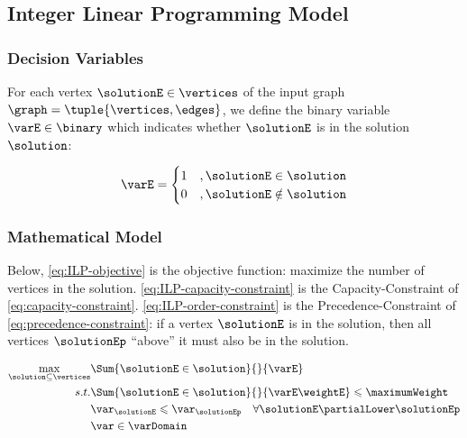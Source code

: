 \subsection{Integer Linear Programming Model}

\subsubsection{Decision Variables}

For each vertex $\solutionE \in \vertices$ of the input graph $\graph = \tuple{\vertices, \edges}$, we define the binary variable $\varE \in \binary$ which indicates whether $\solutionE$ is in the solution $\solution$:

\begin{equation}
    \label{eq:decision-variables}
    \varE =  \begin{cases}
      1 &, \solutionE \in \solution \\
      0 &, \solutionE \notin \solution
   \end{cases}
\end{equation}

\subsubsection{Mathematical Model}

Below, \eqref{eq:ILP-objective} is the objective function: maximize the number of vertices in the solution.
\eqref{eq:ILP-capacity-constraint} is the Capacity-Constraint of \eqref{eq:capacity-constraint}.
\eqref{eq:ILP-order-constraint} is the Precedence-Constraint of \eqref{eq:precedence-constraint}: if a vertex $\solutionE$ is in the solution, then all vertices $\solutionEp$ ``above'' it must also be in the solution.

\begin{align}
    \label{eq:ILP-objective}
    \max\limits_{\solution \subseteq \vertices}
        & \Sum{\solutionE \in \solution}{}{\varE} \\
    s.t.
    \label{eq:ILP-capacity-constraint}
    & \Sum{\solutionE \in \solution}{}{\varE \weightE} \leqslant \maximumWeight \\
    \label{eq:ILP-order-constraint}
    & \var_{\solutionE} \leqslant \var_{\solutionEp} \quad \forall \solutionE \partialLower \solutionEp \\
    \label{eq:ILP-binary-constraint}
    & \var \in \varDomain
\end{align}
